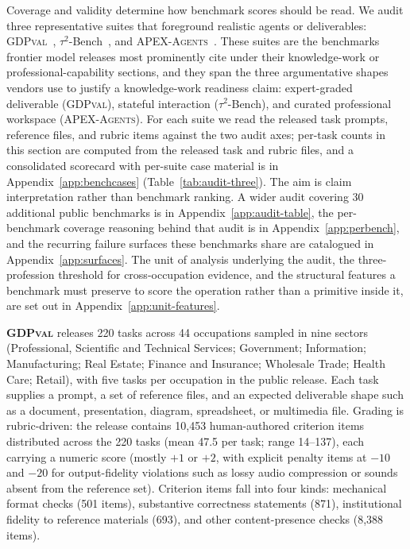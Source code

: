 \documentclass{article}
\begin{document}
Coverage and validity determine how benchmark scores should be read.
We audit three representative suites that foreground realistic agents or deliverables: \textsc{GDPval}~\citep{gdpval2025}, $\tau^2$-Bench~\citep{barres2025tau2}, and \textsc{APEX-Agents}~\citep{vidgen2026apexagents}.
These suites are the benchmarks frontier model releases most prominently cite under their knowledge-work or professional-capability sections, and they span the three argumentative shapes vendors use to justify a knowledge-work readiness claim: expert-graded deliverable (\textsc{GDPval}), stateful interaction ($\tau^2$-Bench), and curated professional workspace (\textsc{APEX-Agents}).
For each suite we read the released task prompts, reference files, and rubric items against the two audit axes; per-task counts in this section are computed from the released task and rubric files, and a consolidated scorecard with per-suite case material is in Appendix~\ref{app:benchcases} (Table~\ref{tab:audit-three}).
The aim is claim interpretation rather than benchmark ranking.
A wider audit covering 30 additional public benchmarks is in Appendix~\ref{app:audit-table}, the per-benchmark coverage reasoning behind that audit is in Appendix~\ref{app:perbench}, and the recurring failure surfaces these benchmarks share are catalogued in Appendix~\ref{app:surfaces}.
The unit of analysis underlying the audit, the three-profession threshold for cross-occupation evidence, and the structural features a benchmark must preserve to score the operation rather than a primitive inside it, are set out in Appendix~\ref{app:unit-features}.

\textbf{\textsc{GDPval}} releases 220 tasks across 44 occupations sampled in nine sectors (Professional, Scientific and Technical Services; Government; Information; Manufacturing; Real Estate; Finance and Insurance; Wholesale Trade; Health Care; Retail), with five tasks per occupation in the public release.
Each task supplies a prompt, a set of reference files, and an expected deliverable shape such as a document, presentation, diagram, spreadsheet, or multimedia file.
Grading is rubric-driven: the release contains 10{,}453 human-authored criterion items distributed across the 220 tasks (mean 47.5 per task; range 14--137), each carrying a numeric score (mostly $+1$ or $+2$, with explicit penalty items at $-10$ and $-20$ for output-fidelity violations such as lossy audio compression or sounds absent from the reference set).
Criterion items fall into four kinds: mechanical format checks (501 items), substantive correctness statements (871), institutional fidelity to reference materials (693), and other content-presence checks (8{,}388 items).
\end{document}
